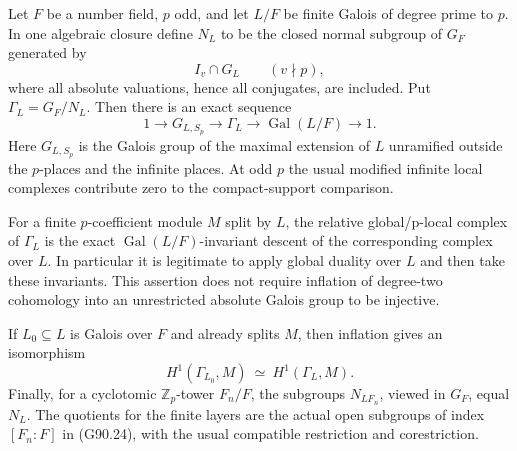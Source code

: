 \begin{proposition}
\label{AC-G90-quotient}
Let \(F\) be a number field, \(p\) odd, and let \(L/F\) be finite
Galois of degree prime to \(p\).  In one algebraic closure define
\(N_L\) to be the closed normal subgroup of \(G_F\) generated by
\[
 I_v\cap G_L\qquad(v\nmid p),
 \tag{G90.23}
\]
where all absolute valuations, hence all conjugates, are included.
Put \(\Gamma_L=G_F/N_L\).  Then there is an exact sequence
\[
 1\longrightarrow G_{L,S_p}\longrightarrow\Gamma_L
       \longrightarrow\operatorname{Gal}(L/F)\longrightarrow1.
 \tag{G90.24}
\]
Here \(G_{L,S_p}\) is the Galois group of the maximal extension of
\(L\) unramified outside the \(p\)-places and the infinite places.
At odd \(p\) the usual modified infinite local complexes contribute
zero to the compact-support comparison.

For a finite \(p\)-coefficient module \(M\) split by \(L\), the relative
global/p-local complex of \(\Gamma_L\) is the exact
\(\operatorname{Gal}(L/F)\)-invariant descent of the corresponding
complex over \(L\).  In particular it is legitimate to apply global
duality over \(L\) and then take these invariants.  This assertion does
not require inflation of degree-two cohomology into an unrestricted
absolute Galois group to be injective.

If \(L_0\subseteq L\) is Galois over \(F\) and already splits \(M\),
then inflation gives an isomorphism
\[
 H^1(\Gamma_{L_0},M)\ \simeq\ H^1(\Gamma_L,M).
 \tag{G90.25}
\]
Finally, for a cyclotomic \(\mathbb Z_p\)-tower \(F_n/F\), the subgroups
\(N_{L F_n}\), viewed in \(G_F\), equal \(N_L\).  The quotients for the
finite layers are the actual open subgroups of index \([F_n:F]\)
in (G90.24), with the usual compatible restriction and corestriction.
\end{proposition}

